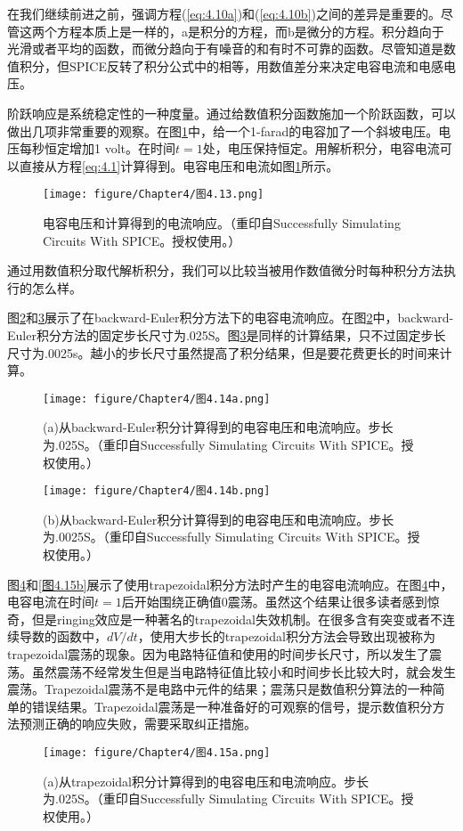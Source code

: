 在我们继续前进之前，强调方程(\ref{eq:4.10a})和(\ref{eq:4.10b})之间的差异是重要的。尽管这两个方程本质上是一样的，a是积分的方程，而b是微分的方程。积分趋向于光滑或者平均的函数，而微分趋向于有噪音的和有时不可靠的函数。尽管知道是数值积分，但SPICE反转了积分公式中的相等，用数值差分来决定电容电流和电感电压。

阶跃响应是系统稳定性的一种度量。通过给数值积分函数施加一个阶跃函数，可以做出几项非常重要的观察。在图\ref{图4.13}中，给一个1-farad的电容加了一个斜坡电压。电压每秒恒定增加1 volt。在时间$t=1$处，电压保持恒定。用解析积分，电容电流可以直接从方程\ref{eq:4.1}计算得到。电容电压和电流如图\ref{图4.13}所示。

\begin{figure}[htbp]
\small
    \centering
    \texttt{[image: figure/Chapter4/图4.13.png]}
    \caption{电容电压和计算得到的电流响应。（重印自Successfully Simulating Circuits With SPICE。授权使用。）}
    \label{图4.13}
\end{figure}

通过用数值积分取代解析积分，我们可以比较当被用作数值微分时每种积分方法执行的怎么样。

图\ref{图4.14a}和\ref{图4.14b}展示了在backward-Euler积分方法下的电容电流响应。在图\ref{图4.14a}中，backward-Euler积分方法的固定步长尺寸为.025S。图\ref{图4.14b}是同样的计算结果，只不过固定步长尺寸为.0025s。越小的步长尺寸虽然提高了积分结果，但是要花费更长的时间来计算。
\begin{figure}[htbp]
\small
    \centering
    \texttt{[image: figure/Chapter4/图4.14a.png]}
    \caption{(a)从backward-Euler积分计算得到的电容电压和电流响应。步长为.025S。（重印自Successfully Simulating Circuits With SPICE。授权使用。）}
    \label{图4.14a}
\end{figure}

\begin{figure}[htbp]
\small
    \centering
    \texttt{[image: figure/Chapter4/图4.14b.png]}
    \caption{(b)从backward-Euler积分计算得到的电容电压和电流响应。步长为.0025S。（重印自Successfully Simulating Circuits With SPICE。授权使用。）}
    \label{图4.14b}
\end{figure}

图\ref{图4.15a}和\ref{图4.15b}展示了使用trapezoidal积分方法时产生的电容电流响应。在图\ref{图4.15a}中，电容电流在时间$t=1$后开始围绕正确值0震荡。虽然这个结果让很多读者感到惊奇，但是ringing效应是一种著名的trapezoidal失效机制。在很多含有突变或者不连续导数的函数中，$dV/dt$，使用大步长的trapezoidal积分方法会导致出现被称为trapezoidal震荡的现象。因为电路特征值\cite{Leon}和使用的时间步长尺寸，所以发生了震荡。虽然震荡不经常发生但是当电路特征值比较小和时间步长比较大时，就会发生震荡。Trapezoidal震荡不是电路中元件的结果；震荡只是数值积分算法的一种简单的错误结果。Trapezoidal震荡是一种准备好的可观察的信号，提示数值积分方法预测正确的响应失败，需要采取纠正措施。
\begin{figure}[htbp]
\small
    \centering
    \texttt{[image: figure/Chapter4/图4.15a.png]}
    \caption{(a)从trapezoidal积分计算得到的电容电压和电流响应。步长为.025S。（重印自Successfully Simulating Circuits With SPICE。授权使用。）}
    \label{图4.15a}
\end{figure}

